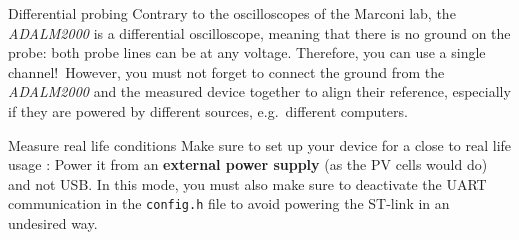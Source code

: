 \begin{bclogo}[couleur = gray!20, arrondi = 0.2, logo=\bcinfo]{Differential probing}
        Contrary to the oscilloscopes of the Marconi lab, the
        \textit{ADALM2000} is a differential oscilloscope, meaning that there
        is no ground on the probe: both probe lines can be at any voltage.
        Therefore, you can use a single channel!\
        However, you must not forget to connect the ground from the \textit{ADALM2000} and the measured device together to align their reference, especially if they are powered by different sources, e.g.\ different computers.
\end{bclogo}
\begin{bclogo}[couleur = gray!20, arrondi = 0.2, logo=\bcattention]{Measure real life conditions}
        Make sure to set up your device for a close to real life usage : Power
        it from an \textbf{external power supply} (as the PV cells would do)
        and not USB. In this mode, you must also make sure to deactivate the
        UART communication in the \texttt{config.h} file to avoid powering the
        ST-link in an undesired way.
\end{bclogo}
